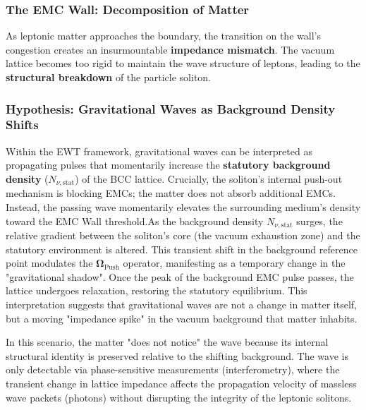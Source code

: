 \documentclass[10pt,a4paper]{article}
\begin{document}
\subsubsection*{The EMC Wall: Decomposition of Matter}
As leptonic matter approaches the boundary, the transition on the wall's congestion creates an insurmountable \textbf{impedance mismatch}. The vacuum lattice becomes too rigid to maintain the wave structure of leptons, leading to the \textbf{structural breakdown} of the particle soliton.

\subsubsection*{Hypothesis: Gravitational Waves as Background Density Shifts}Within the EWT framework, gravitational waves can be interpreted as propagating pulses that momentarily increase the \textbf{statutory background density} ($N_{\nu, \text{stat}}$) of the BCC lattice. Crucially, the soliton's internal push-out mechanism is blocking EMCs; the matter does not absorb additional EMCs. Instead, the passing wave momentarily elevates the surrounding medium's density toward the EMC Wall threshold.As the background density $N_{\nu, \text{stat}}$ surges, the relative gradient between the soliton’s core (the vacuum exhaustion zone) and the statutory environment is altered. This transient shift in the background reference point modulates the $\mathbf{\Omega}_{\text{Push}}$ operator, manifesting as a temporary change in the "gravitational shadow". Once the peak of the background EMC pulse passes, the lattice undergoes relaxation, restoring the statutory equilibrium. This interpretation suggests that gravitational waves are not a change in matter itself, but a moving "impedance spike" in the vacuum background that matter inhabits.

In this scenario, the matter "does not notice" the wave because its internal structural identity is preserved relative to the shifting background. The wave is only detectable via phase-sensitive measurements (interferometry), where the transient change in lattice impedance affects the propagation velocity of massless wave packets (photons) without disrupting the integrity of the leptonic solitons.
\end{document}
